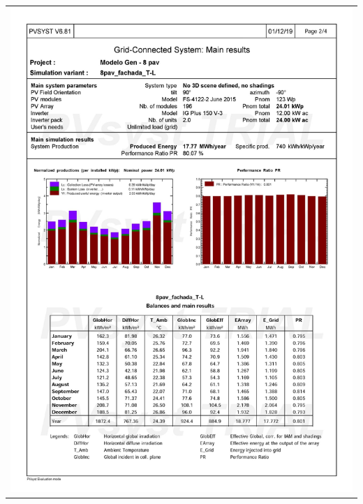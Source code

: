 \begin{table}[H]
    \centering
    \begin{tabular}{l}
        \includegraphics[width=\textwidth]{figures/attachments/resultpv10.jpg}
    \end{tabular}
\end{table}
\pagebreak
